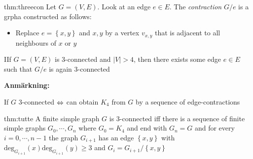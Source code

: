\par\bigskip
\begin{theo}[Contraction]{thm:threecon}
  Let $G = (V,E)$. Look at an edge $e\in E$. The \textit{contraction} $G/e$ is a grpha constructed as follows:\par
  \begin{itemize}
    \item Replace $e = \left\{x,y\right\}$ and $x,y$ by a vertex $v_{x,y}$ that is adjacent to all neighbours of $x$ or $y$
  \end{itemize}
\end{theo}
\par\bigskip
\begin{lem}
  IIf $G = (V,E)$ is 3-connected and $\left|V\right|>4$, then there exists some edge $e\in E$ such that $G/e$ is again 3-connected
\end{lem}
\par\bigskip
\noindent \textbf{Anmärkning:}\par
\noindent If $G$ 3-connected $\Leftrightarrow$ can obtain $K_4$ from $G$ by a sequence of edge-contractions
\par\bigskip
\begin{theo}[Tutte]{thm:tutte}
  A finite simple graph $G$ is 3-connected iff there is a sequence of finite simple graphs $G_0,\cdots,G_n$ where $G_0 = K_4$ and end with $G_n = G$ and for every $i=0,\cdots,n-1$ the graph $G_{i+1}$ has an edge $\left\{x,y\right\}$ with $\text{deg}_{G_{i+1}}(x)\text{deg}_{G_{i+1}}(y)\geq3$ and $G_i = G_{i+1}/\left\{x,y\right\}$
\end{theo}
